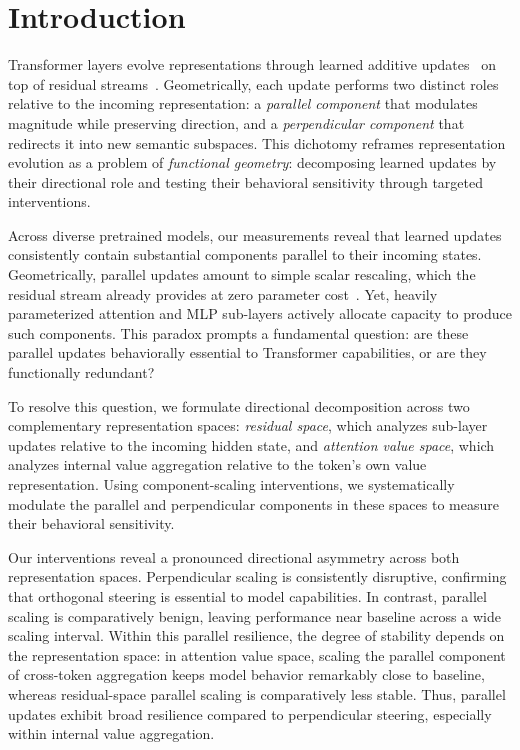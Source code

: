 \section{Introduction}
\label{sec:intro}

Transformer layers evolve representations through learned additive
updates~\citep{vaswani2017attention,elhage2021mathematical} on top of residual
streams~\citep{he2016deep}. Geometrically, each update performs two distinct
roles relative to the incoming representation: a \textit{parallel component}
that modulates magnitude while preserving direction, and a \textit{perpendicular
component} that redirects it into new semantic subspaces. This dichotomy
reframes representation evolution as a problem of \textit{functional geometry}:
decomposing learned updates by their directional role and testing their
behavioral sensitivity through targeted interventions.

Across diverse pretrained models, our measurements reveal that learned updates
consistently contain substantial components parallel to their incoming states.
Geometrically, parallel updates amount to simple scalar rescaling, which the
residual stream already provides at zero parameter cost~\citep{he2016deep,elhage2021mathematical}.
Yet, heavily parameterized attention and MLP sub-layers actively allocate
capacity to produce such components. This paradox prompts a fundamental question:
are these parallel updates behaviorally essential to Transformer capabilities,
or are they functionally redundant?

To resolve this question, we formulate directional decomposition across two
complementary representation spaces: \textit{residual space}, which analyzes
sub-layer updates relative to the incoming hidden state, and \textit{attention
value space}, which analyzes internal value aggregation relative to the token's
own value representation. Using component-scaling interventions, we systematically
modulate the parallel and perpendicular components in these spaces to measure
their behavioral sensitivity.

Our interventions reveal a pronounced directional asymmetry across both
representation spaces. Perpendicular scaling is consistently disruptive,
confirming that orthogonal steering is essential to model capabilities.
In contrast, parallel scaling is comparatively benign, leaving performance
near baseline across a wide scaling interval. Within this parallel resilience,
the degree of stability depends on the representation space: in attention value
space, scaling the parallel component of cross-token aggregation keeps model
behavior remarkably close to baseline, whereas residual-space parallel scaling is
comparatively less stable. Thus, parallel updates exhibit broad resilience
compared to perpendicular steering, especially within internal value aggregation.

